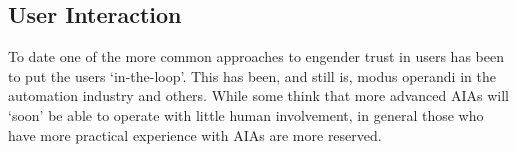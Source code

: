\subsection{User Interaction} \label{sec:user_interaction}
To date one of the more common approaches to engender trust in users has been to put the users `in-the-loop'. This has been, and still is, modus operandi in the automation industry and others. While some think that more advanced AIAs will `soon' be able to operate with little human involvement, in general those who have more practical experience with AIAs are more reserved.

